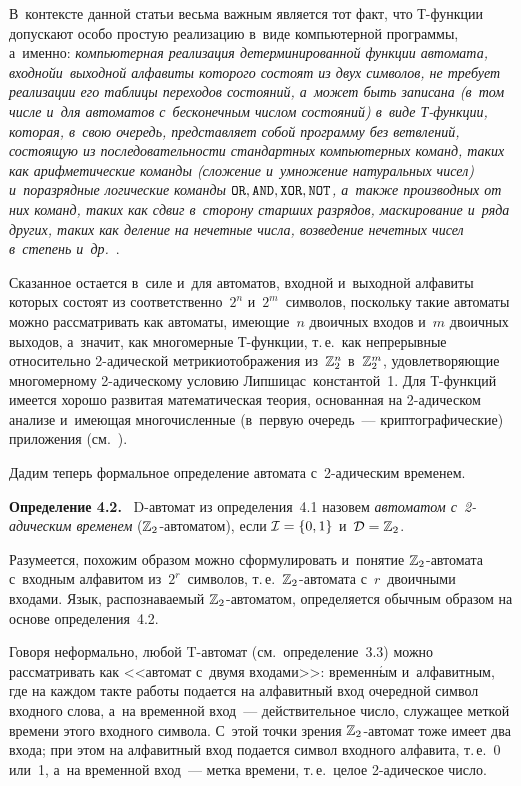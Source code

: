 \begin{multicols}{2}
В~контексте данной статьи
весьма важным является тот факт, что Т-функ\-ции
допускают особо прос\-тую реализацию в~виде компьютерной программы,
а~именно:
\textit{компьютерная реализация детерминированной функции автомата, 
входной\linebreak и~выходной алфавиты которого состоят
из двух символов, не требует реализации его таблицы переходов состояний, а~может
быть записана (в~том числе и~для автоматов с~бесконечным числом состояний)
в~виде Т-функ\-ции, которая, в~свою очередь, представляет собой программу
без ветвлений, состоящую из последовательности стандартных компьютерных
команд, таких как арифметические команды (сложение и~умножение натуральных чисел) 
и~поразрядные логические команды $\mathbin{\mathtt{OR}},\mathbin{\mathtt{AND}},\mathbin{\mathtt{XOR}},\operatorname{\mathtt{NOT}}$, а~также производных
от них команд, таких как сдвиг в~сторону старших разрядов, маскирование 
и~ряда других, таких как деление на нечетные числа, возведение нечетных чисел
в~степень и~др.}~\cite{AnKhr}.

Сказанное остается в~силе и~для автоматов, входной и~выходной алфавиты которых
состоят из соответственно~$2^n$ и~$2^m$~символов, поскольку такие автоматы
можно рассматривать как автоматы, имеющие~$n$ двоичных входов и~$m$ двоичных выходов,
а~значит, как многомерные Т-функ\-ции, т.\,е.\ как непрерывные относительно
\mbox{2-ади}\-че\-ской метрики\linebreak отображения
из~$\mathbb{Z}_2^n$ в~$\mathbb{Z}_2^m$, удовлетворяющие многомерному 2-ади\-че\-ско\-му условию
Липшица\linebreak с~константой~1. Для Т-функ\-ций имеется
хорошо развитая математическая теория, основанная на 2-ади\-че\-ском анализе
и~име\-ющая многочисленные (в~первую очередь~--- криптографические)
приложения (см.~\cite{AnKhr}).

Дадим теперь формальное определение автомата с~2-ади\-че\-ским временем.

\smallskip

\noindent
\textbf{Определение 4.2.}\
D-автомат из определения~4.1 назовем \textit{автоматом с~2-ади\-че\-ским
временем} ($\mathbb{Z}_2$-ав\-то\-ма\-том), если $\Cal I\hm=\{0,1\}$ и~$\Cal D\hm=\Z_2$.


\smallskip

Разумеется, похожим образом можно сформулировать и~понятие $\mathbb{Z}_2$-ав\-то\-ма\-та
с~входным алфавитом из~$2^r$~символов, т.\,е.\ $\mathbb{Z}_2$-ав\-то\-ма\-та с~$r$~двоичными
входами.
Язык, распознаваемый $\mathbb{Z}_2$-ав\-то\-ма\-том, определяется обычным образом на основе
определения~4.2.

Говоря неформально, любой T-ав\-то\-мат (см.\ определение~3.3) можно
рассматривать как <<автомат с~двумя входами>>: временн$\acute{\mbox{ы}}$м и~алфавитным,
где на каждом такте работы  подается на алфавитный вход очередной символ 
входного слова, а~на временной вход~--- действительное чис\-ло, 
служащее меткой времени этого входного символа.  
С~этой точки зрения $\mathbb{Z}_2$-автомат тоже имеет два
входа; при этом на алфавитный вход подается символ входного алфавита, т.\,е.~0 
или~1, а~на временной вход~--- метка времени, т.\,е.\ целое 2-ади\-че\-ское \mbox{число}.


\end{multicols}
